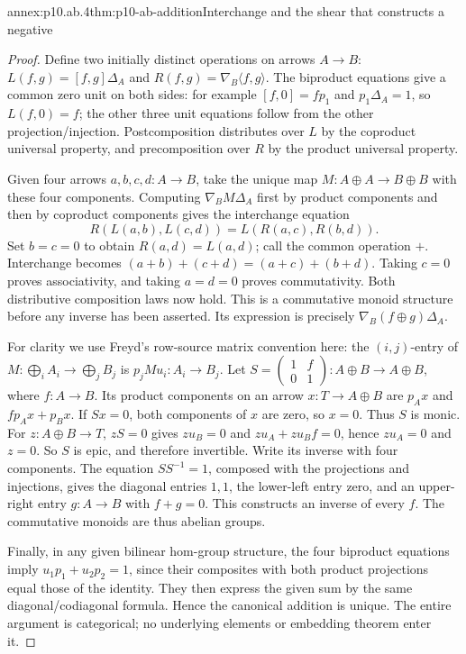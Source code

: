 \begin{annexitem}{annex:p10.ab.4}{thm:p10-ab-addition}{Interchange and the shear that constructs a negative}
\begin{proof}
Define two initially distinct operations on arrows \(A\to B\):
\(L(f,g)=[f,g]\Delta_A\) and
\(R(f,g)=\nabla_B\langle f,g\rangle\).
The biproduct equations give a common zero unit on both sides: for
example \([f,0]=fp_1\) and \(p_1\Delta_A=1\), so \(L(f,0)=f\);
the other three unit equations follow from the other projection/injection.
Postcomposition distributes over \(L\) by the coproduct universal
property, and precomposition over \(R\) by the product universal property.

Given four arrows \(a,b,c,d:A\to B\), take the unique map
\(M:A\oplus A\to B\oplus B\) with these four components.
Computing \(\nabla_BM\Delta_A\) first by product components and
then by coproduct components gives the interchange equation
\[
 R(L(a,b),L(c,d))=L(R(a,c),R(b,d)).
\]
Set \(b=c=0\) to obtain \(R(a,d)=L(a,d)\); call the common
operation \(+\). Interchange becomes
\((a+b)+(c+d)=(a+c)+(b+d)\). Taking \(c=0\) proves associativity,
and taking \(a=d=0\) proves commutativity. Both distributive
composition laws now hold. This is a commutative monoid structure before
any inverse has been asserted. Its expression is precisely
\(\nabla_B(f\oplus g)\Delta_A\).

For clarity we use Freyd's row-source matrix convention here: the
\((i,j)\)-entry of \(M:\bigoplus_i A_i\to\bigoplus_j B_j\) is
\(p_jMu_i:A_i\to B_j\). Let
\(S=\left(\begin{smallmatrix}1&f\\0&1\end{smallmatrix}\right)
:A\oplus B\to A\oplus B\), where \(f:A\to B\).
Its product components on an arrow \(x:T\to A\oplus B\) are
\(p_Ax\) and \(fp_Ax+p_Bx\). If \(Sx=0\), both components of
\(x\) are zero, so \(x=0\). Thus \(S\) is monic.
For \(z:A\oplus B\to T\), \(zS=0\) gives
\(zu_B=0\) and \(zu_A+zu_Bf=0\), hence \(zu_A=0\) and \(z=0\).
So \(S\) is epic, and therefore invertible. Write its inverse with
four components. The equation \(SS^{-1}=1\), composed with the
projections and injections, gives the diagonal entries \(1,1\), the
lower-left entry zero, and an upper-right entry \(g:A\to B\) with
\(f+g=0\). This constructs an inverse of every \(f\). The
commutative monoids are thus abelian groups.

Finally, in any given bilinear hom-group structure, the four biproduct
equations imply \(u_1p_1+u_2p_2=1\), since their composites with
both product projections equal those of the identity. They then express
the given sum by the same diagonal/codiagonal formula. Hence the
canonical addition is unique. The entire argument is categorical;
no underlying elements or embedding theorem enter it.
\end{proof}
\end{annexitem}

